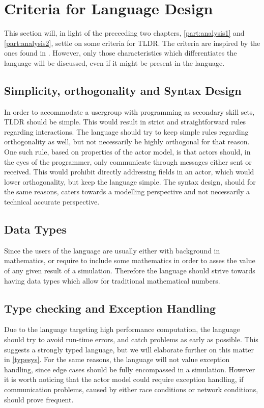 \section{Criteria for Language Design}\label{analsum}

This section will, in light of the preceeding two chapters, \cref{part:analysis1} and \cref{part:analysis2}, settle on some criteria for TLDR. The criteria are inspired by the ones found in . However, only those characteristics which differentiates the language will be discussed, even if it might be present in the language.


\subsection{Simplicity, orthogonality and Syntax Design}

In order to accommodate a usergroup with programming as secondary skill sets, TLDR should be simple. This would result in strict and straightforward rules regarding interactions. The language should try to keep simple rules regarding orthogonality as well, but not necessarily be highly orthogonal for that reason. One such rule, based on properties of the actor model, is that actors should, in the eyes of the programmer, only communicate through messages either sent or received. This would prohibit directly addressing fields in an actor, which would lower orthogonality, but keep the language simple. The syntax design, should for the same reasons, caters towards a modelling perspective and not necessarily a technical accurate perspective.


\subsection{Data Types}

Since the users of the language are usually either with background in mathematics, or require to include some mathematics in order to asses the value of any given result of a simulation. Therefore the language should strive towards having data types which allow for traditional mathematical numbers.


\subsection{Type checking and Exception Handling}

Due to the language targeting high performance computation, the language should try to avoid run-time errors, and catch problems as early as possible. This suggests a strongly typed language, but we will elaborate further on this matter in \cref{typesys}. For the same reasons, the language will not value exception handling, since edge cases should be fully encompassed in a simulation. However it is worth noticing that the actor model could require exception handling, if communication problems, caused by either race conditions or network conditions, should prove frequent.




